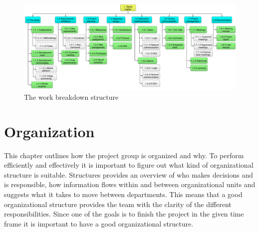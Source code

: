 \begin{figure}[!h]
	\centering
		\includegraphics[width=20cm, angle=90]{images/wbs}
	\caption{The work breakdown structure}
	\label{fig:wbs}
\end{figure}

\section{Organization}
This chapter outlines how the project group is organized and why.
To perform efficiently and effectively it is important to figure out what kind of organizational structure is suitable. 
Structures provides an overview of who makes decisions and is responsible, how information flows within and between organizational units and suggests what it takes to move between departments. This means that a good organizational structure provides the team with the clarity of the different responsibilities. Since one of the goals is to finish the project in the given time frame it is important to have a good organizational structure.


